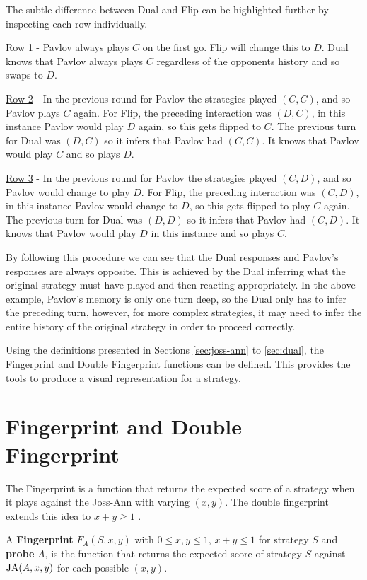 The subtle difference between Dual and Flip can be highlighted further by inspecting each row individually.

\underline{Row 1} - Pavlov always plays $C$ on the first go.
Flip will change this to $D$.
Dual knows that Pavlov always plays $C$ regardless of the opponents history and so swaps to $D$.

\underline{Row 2} - In the previous round for Pavlov the strategies played $(C, C)$, and so Pavlov plays $C$ again.
For Flip, the preceding interaction was $(D, C)$, in this instance Pavlov would play $D$ again, so this gets flipped to $C$.
The previous turn for Dual was $(D, C)$ so it infers that Pavlov had $(C, C)$.
It knows that Pavlov would play $C$ and so plays $D$.

\underline{Row 3} - In the previous round for Pavlov the strategies played $(C, D)$, and so Pavlov would change to play $D$.
For Flip, the preceding interaction was $(C, D)$, in this instance Pavlov would change to $D$, so this gets flipped to play $C$ again.
The previous turn for Dual was $(D, D)$ so it infers that Pavlov had $(C, D)$.
It knows that Pavlov would play $D$ in this instance and so plays $C$.

By following this procedure we can see that the Dual responses and Pavlov's responses are always opposite.
This is achieved by the Dual inferring what the original strategy must have played and then reacting appropriately.
In the above example, Pavlov's memory is only one turn deep, so the Dual only has to infer the preceding turn, however, for more complex strategies, it may need to infer the entire history of the original strategy in order to proceed correctly.

Using the definitions presented in Sections \ref{sec:joss-ann} to \ref{sec:dual}, the Fingerprint and Double Fingerprint functions can be defined.
This provides the tools to produce a visual representation for a strategy.



\section{Fingerprint and Double Fingerprint}
The Fingerprint is a function that returns the expected score of a strategy when it plays against the Joss-Ann with varying $(x, y)$.
The double fingerprint extends this idea to $x+y \geq 1$ \cite{Ashlock2008, Ashlock2010, Ashlock2004,  Ashlock2005, Ashlock2009, Ashlock2006}.

\begin{definition}\label{def:fingerprint}
A \textbf{Fingerprint} $F_A(S, x, y)$ with $0 \leq x, y \leq 1$, $x+y \leq 1$ for strategy $S$ and \textbf{probe} $A$, is the function that returns the expected score of strategy $S$ against $\text{JA}(A, x, y)$ for each possible $(x, y)$.
\end{definition}

